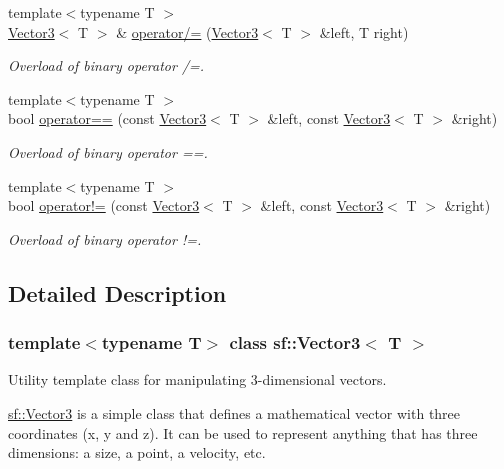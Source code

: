 \begin{DoxyCompactItemize}
{\footnotesize template$<$typename T $>$ }\\\hyperlink{classsf_1_1_vector3}{Vector3}$<$ T $>$ \& \hyperlink{classsf_1_1_vector3_a8995a700f9dffccc6dddb3696ae17b64}{operator/=} (\hyperlink{classsf_1_1_vector3}{Vector3}$<$ T $>$ \&left, T right)
\begin{DoxyCompactList}\small\item\em Overload of binary operator /=. \end{DoxyCompactList}\item 
{\footnotesize template$<$typename T $>$ }\\bool \hyperlink{classsf_1_1_vector3_a388d72db973306a35ba467016b3dee30}{operator==} (const \hyperlink{classsf_1_1_vector3}{Vector3}$<$ T $>$ \&left, const \hyperlink{classsf_1_1_vector3}{Vector3}$<$ T $>$ \&right)
\begin{DoxyCompactList}\small\item\em Overload of binary operator ==. \end{DoxyCompactList}\item 
{\footnotesize template$<$typename T $>$ }\\bool \hyperlink{classsf_1_1_vector3_a608500d1ad3b78082cb5bb4356742bd4}{operator!=} (const \hyperlink{classsf_1_1_vector3}{Vector3}$<$ T $>$ \&left, const \hyperlink{classsf_1_1_vector3}{Vector3}$<$ T $>$ \&right)
\begin{DoxyCompactList}\small\item\em Overload of binary operator !=. \end{DoxyCompactList}\end{DoxyCompactItemize}


\subsection{Detailed Description}
\subsubsection*{template$<$typename T$>$\newline
class sf\+::\+Vector3$<$ T $>$}

Utility template class for manipulating 3-\/dimensional vectors. 

\hyperlink{classsf_1_1_vector3}{sf\+::\+Vector3} is a simple class that defines a mathematical vector with three coordinates (x, y and z). It can be used to represent anything that has three dimensions\+: a size, a point, a velocity, etc.

